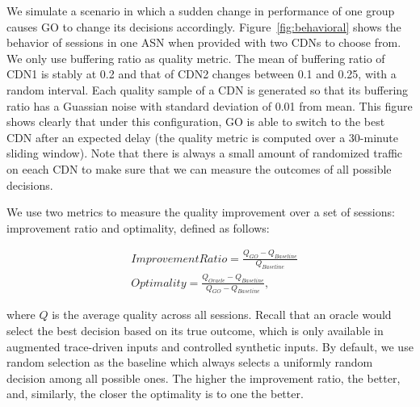  We simulate a scenario in which a sudden
change in performance of one group causes GO to change its decisions
accordingly. Figure~\ref{fig:behavioral} shows the behavior of
sessions in one ASN when provided with two CDNs to choose from. We
only use buffering ratio as quality metric. The mean of buffering
ratio of CDN1 is stably at 0.2 and that of CDN2 changes between 0.1
and 0.25, with a random interval. Each quality sample of a CDN is
generated so that its buffering ratio has a Guassian noise with
standard deviation of 0.01 from mean. This figure shows clearly that
under this configuration, GO is able to switch to the best CDN after
an expected delay (the quality metric is computed over a 30-minute
sliding window). Note that there is always a small amount of
randomized traffic on eeach CDN to make sure that we can measure the
outcomes of all possible decisions. 



\label{subsec:go-improve}

We use two metrics to measure the quality improvement over a set of
sessions: improvement ratio and optimality, defined as follows:

\begin{align*}
& ImprovementRatio=\frac{Q_{GO}-Q_{Baseline}}{Q_{Baseline}}\\
& Optimality=\frac{Q_{Oracle}-Q_{Baseline}}{Q_{GO}-Q_{Baseline}},
\end{align*}

\noindent
where $Q$ is the average quality across all sessions. Recall that an
oracle would select the best decision based on its true outcome, which
is only available in augmented trace-driven inputs and controlled
synthetic inputs.  By default, we use random selection as the baseline
which always selects a uniformly random decision among all possible
ones. The higher the improvement ratio, the better, and, similarly,
the closer the optimality is to one the better.

